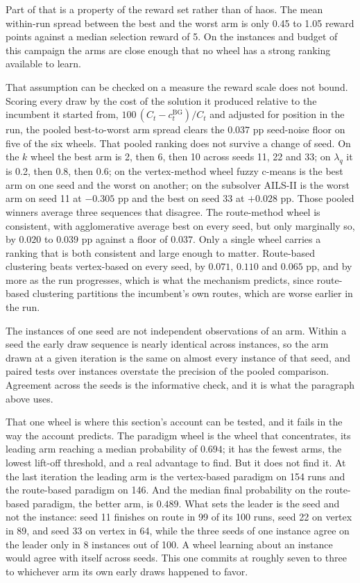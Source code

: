 Part of that is a property of the reward set rather than of \gls{haos}. The mean within-run spread between the best and the worst arm is only 0.45 to 1.05 reward points against a median selection reward of 5.  On the instances and budget of this campaign the arms are close enough that no wheel has a strong ranking available to learn.

That assumption can be checked on a measure the reward scale does not bound.
Scoring every draw by the cost of the solution it produced relative to the
incumbent it started from, $100\,(C_t - c^{\mathrm{BG}}_t)/C_t$ and adjusted
for position in the run, the pooled best-to-worst arm spread clears the
$0.037$ pp seed-noise floor on five of the six wheels. That pooled ranking
does not survive a change of seed. On the $k$ wheel the best arm is 2, then 6,
then 10 across seeds 11, 22 and 33; on $\lambda_q$ it is 0.2, then 0.8, then
0.6; on the vertex-method wheel fuzzy c-means is the best arm on one seed and
the worst on another; on the subsolver AILS-II is the worst arm on seed 11 at
$-0.305$ pp and the best on seed 33 at $+0.028$ pp. Those pooled winners
average three sequences that disagree. The route-method wheel is consistent,
with agglomerative average best on every seed, but only marginally so, by $0.020$ to $0.039$ pp
against a floor of $0.037$. Only a single wheel carries a ranking that is both consistent
and large enough to matter. Route-based clustering beats vertex-based on every
seed, by $0.071$, $0.110$ and $0.065$ pp, and by more as the run progresses,
which is what the mechanism predicts, since route-based clustering partitions
the incumbent's own routes, which are worse earlier in the run.

The instances of one seed are not independent observations of an arm. Within a
seed the early draw sequence is nearly identical across instances, so the arm
drawn at a given iteration is the same on almost every instance of that seed,
and paired tests over instances overstate the precision of the pooled
comparison. Agreement across the seeds is the informative check, and it
is what the paragraph above uses.

That one wheel is where this section's account can be tested, and it fails in
the way the account predicts. The paradigm wheel is the wheel that
concentrates, its leading arm reaching a median probability of $0.694$; it has
the fewest arms, the lowest lift-off threshold, and a real advantage to find.
But it does not find it. At the last iteration the leading arm is the vertex-based paradigm on 154
runs and the route-based paradigm on 146. And the median final probability on the route-based paradigm, the better
arm, is $0.489$. What sets the leader is the seed and not the instance: seed 11
finishes on route in 99 of its 100 runs, seed 22 on vertex in 89, and seed 33
on vertex in 64, while the three seeds of one instance agree on the leader only in 8
instances out of 100. A wheel learning about an instance would agree with
itself across seeds. This one commits at roughly seven to three to whichever
arm its own early draws happened to favor.

